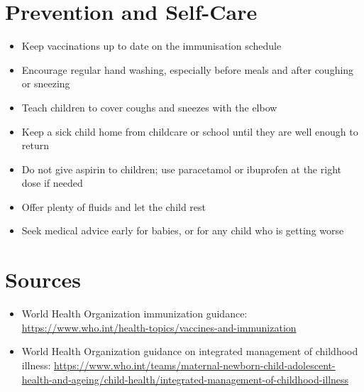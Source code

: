 \section*{Prevention and Self-Care}
\begin{itemize}
    \item Keep vaccinations up to date on the immunisation schedule
    \item Encourage regular hand washing, especially before meals and after coughing or sneezing
    \item Teach children to cover coughs and sneezes with the elbow
    \item Keep a sick child home from childcare or school until they are well enough to return
    \item Do not give aspirin to children; use paracetamol or ibuprofen at the right dose if needed
    \item Offer plenty of fluids and let the child rest
    \item Seek medical advice early for babies, or for any child who is getting worse
\end{itemize}

\section*{Sources}
\begin{itemize}
    \item World Health Organization immunization guidance: \url{https://www.who.int/health-topics/vaccines-and-immunization}
    \item World Health Organization guidance on integrated management of childhood illness: \url{https://www.who.int/teams/maternal-newborn-child-adolescent-health-and-ageing/child-health/integrated-management-of-childhood-illness}
\end{itemize}
